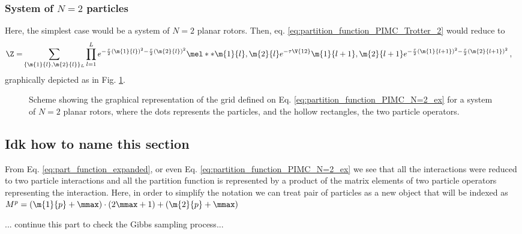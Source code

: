 \newpage

\newpage

\subsubsection{System of $N=2$ particles}

Here, the simplest case would be a system of $N=2$ planar rotors. Then, eq. \eqref{eq:partition_function_PIMC_Trotter_2} would reduce to
\begin{align}
	\label{eq:partition_function_PIMC_N=2_ex}
	\Z =& \sum_{\{\m{1}{l}, \m{2}{l}\}_{L}} \prod_{l=1}^{L} e^{-\frac{\tau}{2}(\m{1}{l})^2-\frac{\tau}{2}(\m{2}{l})^2} \mel**{\m{1}{l},\m{2}{l}}{ e^{ -\tau \V{12}}}{\m{1}{l+1},\m{2}{l+1}} e^{-\frac{\tau}{2}(\m{1}{l+1})^2-\frac{\tau}{2}(\m{2}{l+1})^2} \, ,
\end{align}
graphically depicted as in Fig. \ref{fig:PIMC_grid_N=2}.
\begin{figure}[ht]
	\centering
	\caption{Scheme showing the graphical representation of the grid defined on Eq. \eqref{eq:partition_function_PIMC_N=2_ex} for a system of $N=2$ planar rotors, where the dots represents the particles, and the hollow rectangles, the two particle operators.}
	\label{fig:PIMC_grid_N=2}
\end{figure}



\subsection{Idk how to name this section}
\label{sec:}

From Eq. \eqref{eq:part_function_expanded}, or even Eq. \eqref{eq:partition_function_PIMC_N=2_ex} we see that all the interactions were reduced to two particle interactions and all the partition function is represented by a product of the matrix elements of two particle operators representing the interaction. Here, in order to simplify the notation we can treat pair of particles as a new object that will be indexed as $M^{p} = (\m{1}{p}+\mmax)\cdot (2\mmax+1) + (\m{2}{p}+\mmax)$

\alert{... continue this part to check the Gibbs sampling process...}



\newpage


